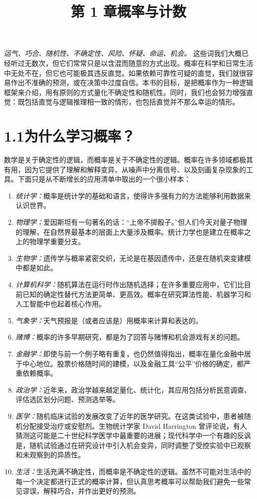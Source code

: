 \documentclass[UTF8,12pt,a4paper,fontset=fandol]{ctexart}
\title{第 1 章\quad 概率与计数}
\author{}
\date{}
\begin{document}
\maketitle

\noindent\textit{运气、巧合、随机性、不确定性、风险、怀疑、命运、机会。}
这些词我们大概已经听过无数次，但它们常常只是以含混而随意的方式出现。概率在科学和日常生活中无处不在，但它也可能极其违反直觉。如果依赖可靠性可疑的直觉，我们就很容易作出不准确的预测，或在决策中过度自信。本书的目标，是把概率作为一种逻辑框架来介绍，用有原则的方式量化不确定性和随机性。同时，我们也会努力增强直觉：既包括直觉与逻辑推理相一致的情形，也包括直觉并不那么幸运的情形。

\section*{1.1\quad 为什么学习概率？}

数学是关于确定性的逻辑，而概率是关于不确定性的逻辑。概率在许多领域都极其有用，因为它提供了理解和解释变异、从噪声中分离信号、以及刻画复杂现象的工具。下面只是从不断增长的应用清单中取出的一个很小样本：

\begin{enumerate}
  \item \textit{统计学：}概率是统计学的基础和语言，使得许多强有力的方法能够利用数据来认识世界。
  \item \textit{物理学：}爱因斯坦有一句著名的话：“上帝不掷骰子。”但人们今天对量子物理的理解，在自然界最基本的层面上大量涉及概率。统计力学也是建立在概率之上的物理学重要分支。
  \item \textit{生物学：}遗传学与概率紧密交织，无论是在基因遗传中，还是在随机突变建模中都是如此。
  \item \textit{计算机科学：}随机算法在运行时作出随机选择；在许多重要应用中，它们比目前已知的确定性替代方法更简单、更高效。概率在研究算法性能、机器学习和人工智能中也起着核心作用。
  \item \textit{气象学：}天气预报是（或者应该是）用概率来计算和表达的。
  \item \textit{赌博：}概率的许多早期研究，都是为了回答与赌博和机会游戏有关的问题。
  \item \textit{金融学：}即使与前一个例子略有重复，也仍然值得指出，概率在量化金融中居于中心地位。股票价格随时间的建模，以及金融工具“公平”价格的确定，都严重依赖概率。
  \item \textit{政治学：}近年来，政治学越来越定量化、统计化，其应用包括分析民意调查、评估选区划分问题、预测选举等。
  \item \textit{医学：}随机临床试验的发展改变了近年的医学研究。在这类试验中，患者被随机分配接受治疗或安慰剂。生物统计学家 David Harrington 曾评论说，有人猜测这可能是二十世纪科学医学中最重要的进展；现代科学中一个有趣的反讽是，随机试验通过在研究设计中引入机会变异，同时调整了受控实验中已观察和未观察到的异质性。
  \item \textit{生活：}生活充满不确定性，而概率是不确定性的逻辑。虽然不可能对生活中的每一个决定都进行正式的概率计算，但认真思考概率可以帮助我们避免一些常见谬误，解释巧合，并作出更好的预测。
\end{enumerate}
\end{document}
